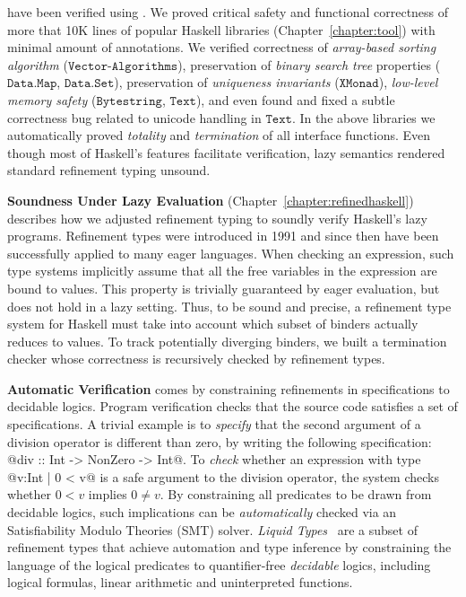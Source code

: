  have been verified using 
\toolname. 
%
We proved critical safety and functional correctness of 
more that 10K lines of popular Haskell libraries (Chapter~\ref{chapter:tool})
with minimal amount of annotations.
%
We verified correctness of \textit{array-based sorting algorithm} ($\texttt{Vector-Algorithms}$),
preservation of \textit{binary search tree} properties ($\texttt{Data.Map}$, $\texttt{Data.Set}$),
preservation of \textit{uniqueness invariants} ($\texttt{XMonad}$), 
\textit{low-level memory safety} ($\texttt{Bytestring}$, $\texttt{Text}$), 
and even found and fixed a subtle correctness bug related to unicode handling in $\texttt{Text}$.
%
In the above libraries we automatically 
proved \textit{totality} and \textit{termination} of 
all interface functions. 
%
Even though most of Haskell's features facilitate verification, 
lazy semantics rendered standard refinement typing unsound. 

\textbf{Soundness Under Lazy Evaluation} (Chapter~\ref{chapter:refinedhaskell}) describes
how we adjusted refinement typing to soundly 
verify Haskell's lazy programs. 
% 
Refinement types were introduced in 1991 %
and since then have been successfully applied to many eager languages.
%
When checking an expression, such type systems
implicitly assume that all the free variables in the expression are
bound to values. 
%
This property is trivially guaranteed by eager evaluation, but 
does not hold in a lazy setting.
% 
Thus, to be sound and precise,
a refinement type system for Haskell 
must take into account which subset of binders
actually reduces to values. 
%
To track potentially diverging binders, 
we built a termination checker 
whose correctness is recursively checked by refinement types.


\textbf{Automatic Verification} comes by constraining refinements in specifications 
to decidable logics. 
Program verification checks that the source code satisfies 
a set of specifications. 
%
A trivial example is to \textit{specify} that the second argument of a division operator 
is different than zero, 
by writing the following specification:
@div :: Int -> NonZero -> Int@.
To \textit{check} whether an expression with type 
@{v:Int | 0 < v}@
is a safe argument to the division operator, the system checks 
whether $ 0 < v $ implies $0 \neq v$. 
%
By constraining all predicates to be drawn from decidable logics, 
such implications can be \textit{automatically} checked via an %
Satisfiability Modulo Theories (SMT) 
solver.
%
\textit{Liquid Types}~\cite{LiquidPLDI09} are a subset of refinement types 
that achieve automation and type inference by 
constraining the language of the logical predicates to quantifier-free \textit{decidable} logics, including 
logical formulas, linear arithmetic and uninterpreted functions.
%

